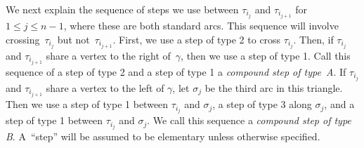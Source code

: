 We next explain the sequence of steps we use between $\tau_{i_j}$ and $\tau_{i_{j+1}}$ for $1 \leq j \leq n-1$, where these are both standard arcs. This sequence will involve crossing~$\tau_{i_j}$ but not~$\tau_{i_{j+1}}$. First, we use a step of type 2 to cross $\tau_{i_j}$. Then, if $\tau_{i_j}$ and $\tau_{i_{j+1}}$ share a vertex to the right of~$\gamma$, then we use a step of type 1. Call this sequence of a step of type 2 and a step of type 1 a \emph{compound step of type~A}. If $\tau_{i_j}$ and $\tau_{i_{j+1}}$ share a vertex to the left of $\gamma$, let $\sigma_j$ be the third arc in this triangle. Then we use a step of type 1 between $\tau_{i_j}$ and $\sigma_j$, a step of type 3 along $\sigma_j$, and a step of type 1 between $\tau_{i_j}$ and $\sigma_j$. We call this sequence a \emph{compound step of type B}. A~``step'' will be assumed to be elementary unless otherwise specified.


